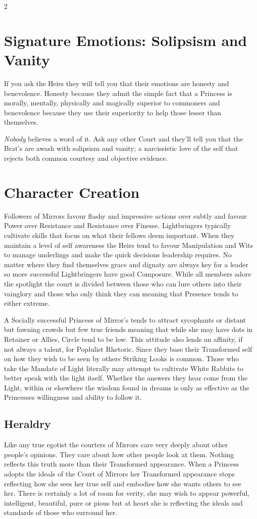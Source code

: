\begin{multicols}{2}
\section*{Signature Emotions: Solipsism and Vanity}

If you ask the Heirs they will tell you that their emotions are honesty and benevolence. Honesty because they admit the simple fact that a Princess is morally, mentally, physically and magically superior to commoners and benevolence because they use their superiority to help those lesser than themselves. 

\textit{Nobody} believes a word of it. Ask any other Court and they'll tell you that the Brat's are awash with solipsism and vanity; a narcissistic love of the self that rejects both common courtesy and objective evidence. 

\section*{Character Creation}
Followers of Mirrors favour flashy and impressive actions over subtly and favour Power over Resistance and Resistance over Finesse. Lightbringers typically cultivate skills that focus on what their fellows deem important. When they maintain a level of self awareness the Heirs tend to favour Manipulation and Wits to manage underlings and make the quick decisions leadership requires. No matter where they find themselves grace and dignaty are always key for a leader so more successful Lightbringers have good Composure. While all members adore the spotlight the court is divided between those who can lure others into their vainglory and those who only think they can meaning that Presence tends to either extreme.

A Socially successful Princess of Mirror's tends to attract sycophants or distant but fawning crowds but few true friends meaning that while she may have dots in Retainer or Allies, Circle tend to be low. This attitude also lends an affinity, if not always a talent, for Poplulist Rhetoric. Since they base their Transformed self on how they wish to be seen by others Striking Looks is common. Those who take the Mandate of Light literally may attempt to cultivate White Rabbits to better speak with the light itself. Whether the answers they hear come from the Light, within or elsewhere the wisdom found in dreams is only as effective as the Princesses willingness and ability to follow it. 

\subsection*{Heraldry}
Like any true egotist the courters of Mirrors care very deeply about other people's opinions. They care about how other people look at them. Nothing reflects this truth more than their Transformed appearance. When a Princess adopts the ideals of the Court of Mirrors her Transformed appearance stops reflecting how she sees her true self and embodies how she wants others to see her. There is certainly a lot of room for verity, she may wish to appear powerful, intelligent, beautiful, pure or pious but at heart she is reflecting the ideals and standards of those who surround her.


\end{multicols}
